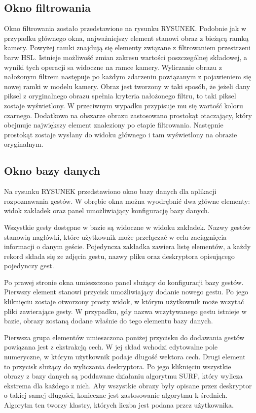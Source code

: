 \subsection{Okno filtrowania}
Okno filtrowania zostało przedstawione na rysunku RYSUNEK. Podobnie jak w  przypadku głównego okna, najważniejszy element stanowi obraz z bieżącą ramką kamery. Powyżej ramki znajdują się elementy związane z filtrowaniem przestrzeni barw HSL. Istnieje możliwość zmian zakresu wartości poszczególnej składowej, a wyniki tych operacji sa widoczne na ramce kamery. Wyliczanie obrazu z nałożonym filtrem następuje po każdym zdarzeniu powiązanym z pojawieniem się nowej ramki w modelu kamery.
Obraz jest tworzony w taki sposób, że jeżeli dany piksel z oryginalnego obrazu spełnia kryteria nałożonego filtru, to taki piksel zostaje wyświetlony. W przeciwnym wypadku przypisuje mu się wartość koloru czarnego. Dodatkowo na obszarze obrazu zastosowano prostokąt otaczający, który obejmuje największy element znaleziony po etapie filtrowania. Następnie prostokąt zostaje wysłany do widoku głównego i tam wyświetlony na obrazie oryginalnym. 
\subsection{Okno bazy danych}

Na rysunku RYSUNEK przedstawiono okno bazy danych dla aplikacji rozpoznawania gestów. W obrębie okna można wyodrębnić dwa główne elementy: widok zakładek oraz panel umożliwiający konfigurację bazy danych. 

Wszystkie gesty dostępne w bazie są widoczne w widoku zakładek. Nazwy gestów stanowią nagłówki, które użytkownik może przełączać w celu zaciągnięcia informacji o danym geście. Pojedyncza zakładka zawiera listę elementów, a każdy rekord składa się ze zdjęcia gestu, nazwy pliku oraz deskryptora opisującego pojedynczy gest.

Po prawej stronie okna umieszczono panel służący do konfiguracji bazy gestów. Pierwszy element stanowi przycisk umożliwiający dodanie nowego gestu. Po jego kliknięciu zostaje otworzony prosty widok, w którym użytkownik może wczytać pliki zawierające gesty. W przypadku, gdy nazwa wczytywanego gestu istnieje w bazie, obrazy zostaną dodane właśnie do tego elementu bazy danych. 

Pierwsza grupa elementów umieszczona poniżej przycisku do dodawania gestów powiązana jest z ekstrakcją cech. W jej skład wchodzi edytowalne pole numeryczne, w którym użytkownik podaje długość wektora cech. Drugi element to przycisk służący do wyliczania deskryptora. Po jego kliknięciu wszystkie obrazy z bazy danych są poddawane działaniu algorytmu SURF, który wylicza ekstrema dla każdego z nich. Aby wszystkie obrazy były opisane przez deskryptor o takiej samej długości, konieczne jest zastosowanie algorytmu k-średnich. Algorytm ten tworzy klastry, których liczba jest podana przez użytkownika.

